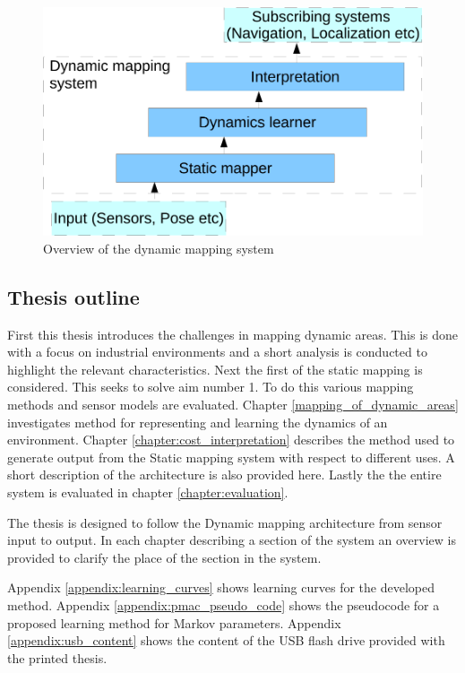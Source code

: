 \begin{figure} [htbp]
	\centering
	\includegraphics[scale=0.7]{chapters/introduction/figures/system-overview}
	\caption{Overview of the dynamic mapping system}
	\label{fig:block-overview}
\end{figure}

\subsection{Thesis outline}
First this thesis introduces the challenges in mapping dynamic areas. This is done with a focus on industrial environments and a short analysis is conducted to highlight the relevant characteristics.
Next the first of the static mapping is considered. 
This seeks to solve aim number 1. 
To do this various mapping methods and sensor models are evaluated.
Chapter \ref{mapping_of_dynamic_areas} investigates method for representing and learning the dynamics of an environment. 
Chapter \ref{chapter:cost_interpretation} describes the method used to generate output from the Static mapping system with respect to different uses. 
A short description of the architecture is also provided here. 
Lastly the the entire system is evaluated in chapter \ref{chapter:evaluation}.

The thesis is designed to follow the Dynamic mapping architecture from sensor input to output. 
In each chapter describing a section of the system an overview is provided to clarify the place of the section in the system. 
 
Appendix \ref{appendix:learning_curves} shows learning curves for the developed method.
Appendix \ref{appendix:pmac_pseudo_code} shows the pseudocode for a proposed learning method for Markov parameters.
Appendix \ref{appendix:usb_content} shows the content of the USB flash drive provided with the printed thesis. 

